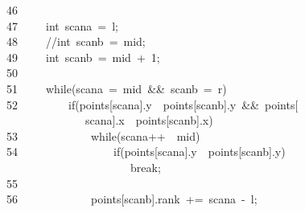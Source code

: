 \documentclass{article}
\newcommand{\hlstd}[1]{\textcolor[rgb]{0.2,0.2,0.2}{#1}}
\newcommand{\hlnum}[1]{\textcolor[rgb]{0.06,0.58,0.63}{#1}}
\newcommand{\hlslc}[1]{\textcolor[rgb]{0.59,0.59,0.59}{#1}}
\newcommand{\hlopt}[1]{\textcolor[rgb]{0.2,0.2,0.2}{#1}}
\newcommand{\hllin}[1]{\textcolor[rgb]{0.59,0.59,0.59}{#1}}
\newcommand{\hlkwa}[1]{\textcolor[rgb]{0.23,0.42,0.78}{#1}}
\newcommand{\hlkwb}[1]{\textcolor[rgb]{0.63,0,0.31}{#1}}
\begin{document}
	\hllin{46\ }\hlstd{}\\
	\hllin{47\ }\hlstd{}\hlstd{\ \ \ \ }\hlstd{}\hlkwb{int\ }\hlstd{scan\textunderscore a\ }\hlopt{=\ }\hlstd{l}\hlopt{;}\\
	\hllin{48\ }\hlstd{}\hlstd{\ \ \ \ }\hlstd{}\hlslc{//int\ scan\textunderscore b\ =\ mid;}\\
	\hllin{49\ }\hlstd{}\hlstd{\ \ \ \ }\hlstd{}\hlkwb{int\ }\hlstd{scan\textunderscore b\ }\hlopt{=\ }\hlstd{mid\ }\hlopt{+\ }\hlstd{}\hlnum{1}\hlstd{}\hlopt{;}\\
	\hllin{50\ }\hlstd{}\\
	\hllin{51\ }\hlstd{}\hlstd{\ \ \ \ }\hlstd{}\hlkwa{while}\hlstd{}\hlopt{(}\hlstd{scan\textunderscore a\ }\hlopt{\usebox{\hlboxlessthan}=\ }\hlstd{mid\ }\hlopt{\&\&\ }\hlstd{scan\textunderscore b\ }\hlopt{\usebox{\hlboxlessthan}=\ }\hlstd{r}\hlopt{)\usebox{\hlboxopenbrace}}\\
	\hllin{52\ }\hlstd{}\hlstd{\ \ \ \ \ \ \ \ }\hlstd{}\hlkwa{if}\hlstd{}\hlopt{(}\hlstd{points}\hlopt{{[}}\hlstd{scan\textunderscore a}\hlopt{{]}.}\hlstd{y\ }\hlopt{\usebox{\hlboxlessthan}\ }\hlstd{points}\hlopt{{[}}\hlstd{scan\textunderscore b}\hlopt{{]}.}\hlstd{y\ }\hlopt{\&\&\ }\hlstd{points}\hlopt{{[}}\\
	\hllin{\ \ \ }\hlstd{}\hlstd{\ \ \ \ \ \ \ \ \ \ \ }\hlstd{scan\textunderscore a}\hlopt{{]}.}\hlstd{x\ }\hlopt{\usebox{\hlboxlessthan}\ }\hlstd{points}\hlopt{{[}}\hlstd{scan\textunderscore b}\hlopt{{]}.}\hlstd{x}\hlopt{)\usebox{\hlboxopenbrace}}\\
	\hllin{53\ }\hlstd{}\hlstd{\ \ \ \ \ \ \ \ \ \ \ \ }\hlstd{}\hlkwa{while}\hlstd{}\hlopt{(}\hlstd{scan\textunderscore a}\hlopt{++\ \usebox{\hlboxlessthan}\ }\hlstd{mid}\hlopt{)\usebox{\hlboxopenbrace}}\Righttorque\\
	\hllin{54\ }\hlstd{}\hlstd{\ \ \ \ \ \ \ \ \ \ \ \ \ \ \ \ }\hlstd{}\hlkwa{if}\hlstd{}\hlopt{(}\hlstd{points}\hlopt{{[}}\hlstd{scan\textunderscore a}\hlopt{{]}.}\hlstd{y\ }\hlopt{\usebox{\hlboxgreaterthan}\ }\hlstd{points}\hlopt{{[}}\hlstd{scan\textunderscore b}\hlopt{{]}.}\hlstd{y}\hlopt{)\ }\Righttorque\\
	\hllin{\ \ \ }\hlstd{}\hlstd{\ \ \ \ \ \ \ \ \ \ \ \ \ \ \ \ \ \ \ }\hlstd{}\hlkwa{break}\hlstd{}\hlopt{;}\\
	\hllin{55\ }\hlstd{}\hlstd{\ \ \ \ \ \ \ \ \ \ \ \ }\hlstd{}\hlopt{\usebox{\hlboxclosebrace}}\\
	\hllin{56\ }\hlstd{}\hlstd{\ \ \ \ \ \ \ \ \ \ \ \ }\hlstd{points}\hlopt{{[}}\hlstd{scan\textunderscore b}\hlopt{{]}.}\hlstd{rank\ }\hlopt{+=\ }\hlstd{scan\textunderscore a\ }\hlopt{{-}\ }\hlstd{l}\hlopt{;}\Righttorque\\
\end{document}
